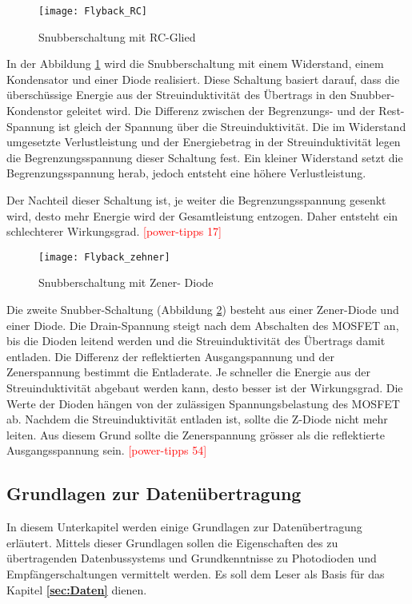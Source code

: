 \begin{figure}[H]
	\centering
	\texttt{[image: Flyback\_RC]}
	\caption{Snubberschaltung mit RC-Glied}\label{fig:Flyback_RC}
\end{figure}

In der Abbildung \ref{fig:Flyback_RC} wird die Snubberschaltung mit einem Widerstand, einem Kondensator und einer Diode realisiert. Diese Schaltung basiert darauf, dass die überschüssige Energie aus der Streuinduktivität des Übertrags in den Snubber-Kondenstor geleitet wird. Die Differenz zwischen der Begrenzungs- und der Rest-Spannung ist gleich der Spannung über die Streuinduktivität. Die im Widerstand umgesetzte Verlustleistung und der Energiebetrag in der Streuinduktivität legen die Begrenzungsspannung dieser Schaltung fest. Ein kleiner Widerstand setzt die Begrenzungsspannung herab, jedoch entsteht eine höhere Verlustleistung. 

Der Nachteil dieser Schaltung ist, je weiter die Begrenzungsspannung gesenkt wird, desto mehr Energie wird der Gesamtleistung entzogen. Daher entsteht ein schlechterer Wirkungsgrad. \textcolor{red}{[power-tipps 17]}

\begin{figure}[H]
	\centering
	\texttt{[image: Flyback\_zehner]}
	\caption{Snubberschaltung mit Zener- Diode}\label{fig:Flyback_zehner}
\end{figure}

Die zweite Snubber-Schaltung (Abbildung \ref{fig:Flyback_zehner}) besteht aus einer Zener-Diode und einer Diode. Die Drain-Spannung steigt nach dem Abschalten des MOSFET an, bis die Dioden leitend werden und die Streuinduktivität des Übertrags damit entladen. Die Differenz der reflektierten Ausgangspannung und der Zenerspannung bestimmt die Entladerate. Je schneller die Energie aus der Streuinduktivität abgebaut werden kann, desto besser ist der Wirkungsgrad. Die Werte der Dioden hängen von der zulässigen Spannungsbelastung des MOSFET ab. Nachdem die Streuinduktivität entladen ist, sollte die Z-Diode nicht mehr leiten. Aus diesem Grund sollte die Zenerspannung grösser als die reflektierte Ausgangsspannung sein. \textcolor{red}{[power-tipps 54]}

\subsection{Grundlagen zur Datenübertragung}
In diesem Unterkapitel werden einige Grundlagen zur Datenübertragung erläutert. Mittels dieser Grundlagen sollen die Eigenschaften des zu übertragenden Datenbussystems und Grundkenntnisse zu Photodioden und Empfängerschaltungen vermittelt werden. Es soll dem Leser als Basis für das Kapitel \textbf{\ref{sec:Daten} } dienen.

